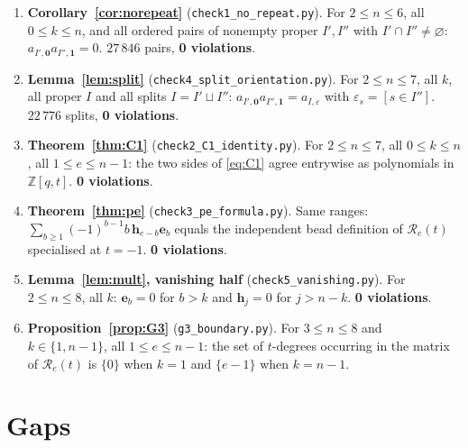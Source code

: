 \documentclass[11pt]{article}
\theoremstyle{plain}
\theoremstyle{definition}
\newcommand{\ZZ}{\mathbb{Z}}
\newcommand{\bh}{\mathbf h}
\newcommand{\be}{\mathbf e}
\begin{document}
\begin{enumerate}
\item \textbf{Corollary~\ref{cor:norepeat}} (\texttt{check1\_no\_repeat.py}).
For $2\le n\le6$, all $0\le k\le n$, and all ordered pairs of nonempty proper
$I',I''$ with $I'\cap I''\ne\varnothing$: $a_{I',\mathbf 0}a_{I'',\mathbf 1}=0$.
$27\,846$ pairs, \textbf{0 violations}.
\item \textbf{Lemma~\ref{lem:split}} (\texttt{check4\_split\_orientation.py}).
For $2\le n\le7$, all $k$, all proper $I$ and all splits $I=I'\sqcup I''$:
$a_{I',\mathbf 0}a_{I'',\mathbf 1}=a_{I,\varepsilon}$ with
$\varepsilon_s=[s\in I'']$.  $22\,776$ splits, \textbf{0 violations}.
\item \textbf{Theorem~\ref{thm:C1}} (\texttt{check2\_C1\_identity.py}).
For $2\le n\le7$, all $0\le k\le n$, all $1\le e\le n-1$: the two sides of
\eqref{eq:C1} agree entrywise as polynomials in $\ZZ[q,t]$.
\textbf{0 violations}.
\item \textbf{Theorem~\ref{thm:pe}} (\texttt{check3\_pe\_formula.py}).
Same ranges: $\sum_{b\ge1}(-1)^{b-1}b\,\bh_{e-b}\be_b$ equals the independent
bead definition of $\mathcal R_e(t)$ specialised at $t=-1$.
\textbf{0 violations}.
\item \textbf{Lemma~\ref{lem:mult}, vanishing half}
(\texttt{check5\_vanishing.py}).  For $2\le n\le8$, all $k$:
$\be_b=0$ for $b>k$ and $\bh_j=0$ for $j>n-k$.  \textbf{0 violations}.
\item \textbf{Proposition~\ref{prop:G3}} (\texttt{g3\_boundary.py}).
For $3\le n\le8$ and $k\in\{1,n-1\}$, all $1\le e\le n-1$: the set of
$t$-degrees occurring in the matrix of $\mathcal R_e(t)$ is $\{0\}$ when $k=1$
and $\{e-1\}$ when $k=n-1$.
\end{enumerate}

\section{Gaps}\label{sec:gaps}
\end{document}
